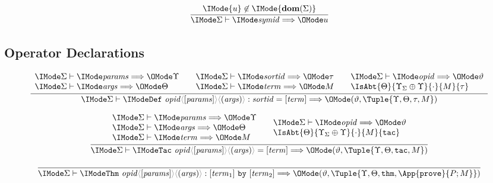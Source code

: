 \begin{gather}
  \infer{
    \Elab{\Sigma}{\SortSymId}{u}
  }{
    \IMode{u}\not\in\IMode{\mathbf{dom}(\Sigma)}
  }
\end{gather}

\subsection*{Operator Declarations\hfill {}}

\begin{gather}
  \infer{
    \Elab{\Sigma}{
      \ProdDefDecl{\SortOpId}{\SortParams}{\SortArgs}{\SortSortId}{\SortTerm}
    }{(\vartheta,\Tuple{\Upsilon,\Theta,\tau,M})}
  }{
    \begin{array}{l}
      \Elab{\Sigma}{\SortParams}{\Upsilon}\\
      \Elab{\Sigma}{\SortArgs}{\Theta}\\
    \end{array} &
    \begin{array}{l}
      \Elab{\Sigma}{\SortSortId}{\tau}\\
      \Elab{\Sigma}{\SortTerm}{M}
    \end{array} &
    \begin{array}{l}
      \Elab{\Sigma}{\SortOpId}{\vartheta}\\
      \IsAbt{\Theta}{\Upsilon_\Sigma\oplus\Upsilon}{\cdot}{M}{\tau}
    \end{array}
  }\\[6pt]
  \infer{
    \Elab{\Sigma}{
      \ProdTacDecl{\SortOpId}{\SortParams}{\SortArgs}{\SortTerm}
    }{(\vartheta,\Tuple{\Upsilon,\Theta,\AbtSortTac,M})}
  }{
    \begin{array}{l}
      \Elab{\Sigma}{\SortParams}{\Upsilon}\\
      \Elab{\Sigma}{\SortArgs}{\Theta}\\
      \Elab{\Sigma}{\SortTerm}{M}
    \end{array} &
    \begin{array}{l}
      \Elab{\Sigma}{\SortOpId}{\vartheta}\\
      \IsAbt{\Theta}{\Upsilon_\Sigma\oplus\Upsilon}{\cdot}{M}{\AbtSortTac}
    \end{array}
  }\\[6pt]
  \infer{
    \Elab{\Sigma}{
      \ProdThmDecl{\SortOpId}{\SortParams}{\SortArgs}{\SortTerm_1}{\SortTerm_2}
    }{(\vartheta,\Tuple{\Upsilon,\Theta,\AbtSortThm,\App{\OpProve}{P;M}})}
  }{
    \begin{array}{l}

\end{array}}
\end{gather}
